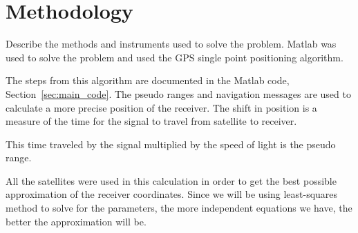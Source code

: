\section{Methodology} 

\label{sec:methodology}

Describe the methods and instruments used to solve the problem. Matlab was used to solve the problem and used the GPS single point positioning algorithm.\cite{milanGPS} 

The steps from this algorithm are documented in the Matlab code, Section~\ref{sec:main_code}. The pseudo ranges and navigation messages are used to calculate a more precise position of the receiver.  The shift in position is a measure of the time for the signal to travel from satellite to receiver. 

This time traveled by the signal multiplied by the speed of light is the pseudo range.  

All the satellites were used in this calculation in order to get the best possible approximation of the receiver coordinates.  Since we will be using least-squares method to solve for the parameters, the more independent equations we have, the better the approximation will be.   



